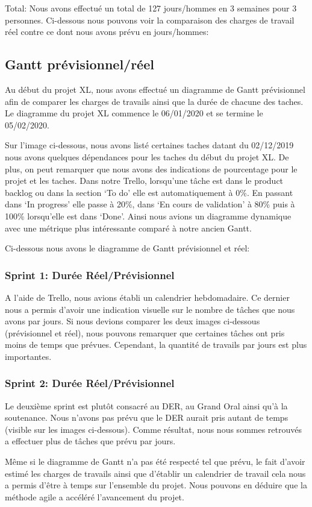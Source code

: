Total:  Nous avons effectué un total de 127 jours/hommes en 3 semaines pour 3 personnes. 
Ci-dessous nous pouvons voir la comparaison des charges de travail réel contre ce dont nous avons prévu en jours/hommes: 




\subsection{Gantt prévisionnel/réel}
Au début du projet XL, nous avons effectué un diagramme de Gantt prévisionnel afin de comparer les charges de travails ainsi que la durée de chacune des taches.
Le diagramme du projet XL commence le 06/01/2020 et se termine le 05/02/2020.

Sur l'image ci-dessous, nous avons listé certaines taches datant du 02/12/2019 nous avons quelques dépendances pour les taches du début du projet XL\@.
De plus, on peut remarquer que nous avons des indications de pourcentage pour le projet et les taches.
Dans notre Trello, lorsqu'une tâche est dans le product backlog ou dans la section `To do' elle est automatiquement à 0\%.
En passant dans `In progress' elle passe à 20\%, dans `En cours de validation' à 80\% puis à 100\% lorsqu'elle est dans `Done'.
Ainsi nous avions un diagramme dynamique avec une métrique plus intéressante comparé à notre ancien Gantt. 



Ci-dessous nous avons le diagramme de Gantt prévisionnel et réel: 






\subsubsection{Sprint 1: Durée Réel/Prévisionnel}
A l'aide de Trello, nous avions établi un calendrier hebdomadaire.
Ce dernier nous a permis d'avoir une indication visuelle sur le nombre de tâches que nous avons par jours.
Si nous devions comparer les deux images ci-dessous (prévisionnel et réel), nous pouvons remarquer que certaines tâches ont pris moins de temps que prévues.
Cependant, la quantité de travails par jours est plus importantes.






\subsubsection{Sprint 2: Durée Réel/Prévisionnel}
Le deuxième sprint est plutôt consacré au DER, au Grand Oral ainsi qu'à la soutenance.
Nous n'avons pas prévu que le DER aurait pris autant de temps (visible sur les images ci-dessous).
Comme résultat, nous nous sommes retrouvés a effectuer plus de tâches que prévu par jours.






Même si le diagramme de Gantt n'a pas été respecté tel que prévu, le fait d’avoir estimé les charges de travails ainsi que d'établir un calendrier de travail cela nous a permis d'être à temps sur l’ensemble du projet.
Nous pouvons en déduire que la méthode agile a accéléré l'avancement du projet.
